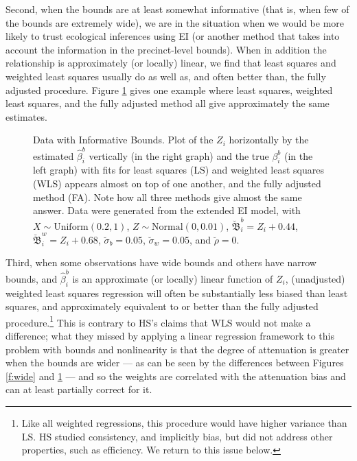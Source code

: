 \documentclass[11pt,titlepage]{article}
\newcommand{\bbeta}{{\mathfrak B}}
\newcommand{\sigmau}{\breve{\sigma}}
\newcommand{\rhou}{\breve{\rho}}
\begin{document}
Second, when the bounds are at least somewhat informative (that is,
when few of the bounds are extremely wide), we are in the situation
when we would be more likely to trust ecological inferences using EI
(or another method that takes into account the information in the
precinct-level bounds).  When in addition the relationship is
approximately (or locally) linear, we find that least squares and
weighted least squares usually do as well as, and often better than,
the fully adjusted procedure.  Figure \ref{f:narrow} gives one example
where least squares, weighted least squares, and the fully adjusted
method all give approximately the same estimates.
\begin{figure}[t]
  \begin{center}
    \caption{Data with Informative Bounds. Plot of the $Z_i$ horizontally by
      the estimated $\hat\beta_i^b$ vertically (in the right graph)
      and the true $\beta_i^b$ (in the left graph) with fits for least
      squares (LS) and weighted least squares (WLS) appears almost on
      top of one another, and the fully adjusted method (FA).  Note
      how all three methods give almost the same answer. Data were
      generated from the extended EI model, with $X \sim
      \textrm{Uniform}(0.2,1)$, $Z \sim \textrm{Normal}(0,0.01)$,
      $\breve\bbeta_i^b = Z_i + 0.44$, $\breve\bbeta_i^w = Z_i +
      0.68$, $\sigmau_b = 0.05$, $\sigmau_w = 0.05$, and $\rhou = 0$.}
    \label{f:narrow}
  \end{center}
\end{figure}

Third, when some observations have wide bounds and others have narrow
bounds, and $\hat\beta_i^b$ is an approximate (or locally) linear
function of $Z_i$, (unadjusted) weighted least squares regression will
often be substantially less biased than least squares, and
approximately equivalent to or better than the fully adjusted
procedure.\footnote{Like all weighted regressions, this procedure
  would have higher variance than LS. HS studied consistency, and
  implicitly bias, but did not address other properties, such as
  efficiency.  We return to this issue below.}  This is contrary to
HS's claims that WLS would not make a difference; what they missed by
applying a linear regression framework to this problem with bounds and
nonlinearity is that the degree of attenuation is greater when the
bounds are wider --- as can be seen by the differences between Figures
\ref{f:wide} and \ref{f:narrow} --- and so the weights are correlated
with the attenuation bias and can at least partially correct for it.
\end{document}
